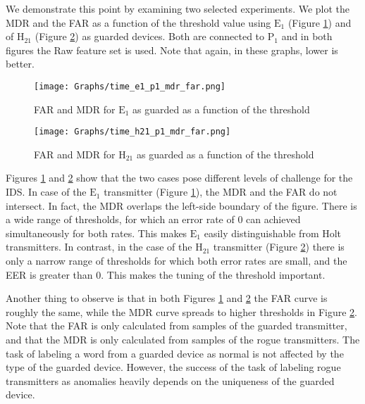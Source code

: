 \documentclass[conference]{IEEEtran}
\begin{document}
  We demonstrate this point by examining two selected experiments. We plot the MDR and the FAR as a function of the threshold value using \(\text{E}_1\) (Figure \ref{fig:detection_easy_example}) and of \(\text{H}_{21}\) (Figure \ref{fig:detection_difficult_example}) as guarded devices. Both are connected to \(\text{P}_1\) and in both figures the Raw feature set is used. Note that again, in these graphs, lower is better.
  
  \begin{figure}[t]
    \centering
    \texttt{[image: Graphs/time\_e1\_p1\_mdr\_far.png]}
    \caption{FAR and MDR for \(\text{E}_1\) as guarded as a function of the threshold}
    \label{fig:detection_easy_example}
  \end{figure}
  
  \begin{figure}[t]
    \centering
    \texttt{[image: Graphs/time\_h21\_p1\_mdr\_far.png]}
    \caption{FAR and MDR for \(\text{H}_{21}\) as guarded as a function of the threshold}
    \label{fig:detection_difficult_example}
  \end{figure}
  
  Figures \ref{fig:detection_easy_example} and \ref{fig:detection_difficult_example} show that the two cases pose different levels of challenge for the IDS.
  In case of the \(\text{E}_1\) transmitter (Figure \ref{fig:detection_easy_example}), the MDR and the FAR do not intersect. In fact, the MDR overlaps the left-side boundary of the figure. There is a wide range of thresholds, for which an error rate of 0 can achieved simultaneously for both rates. This makes \(\text{E}_1\) easily distinguishable from Holt transmitters. In contrast, in the case of the \(\text{H}_{21}\) transmitter (Figure \ref{fig:detection_difficult_example}) there is only a narrow range of thresholds for which both error rates are small, and the EER is greater than 0. This makes the tuning of the threshold important.
  
  Another thing to observe is that in both Figures \ref{fig:detection_easy_example} and \ref{fig:detection_difficult_example} the FAR curve is roughly the same, while the MDR curve spreads to higher thresholds in Figure \ref{fig:detection_difficult_example}. Note that the FAR is only calculated from samples of the guarded transmitter, and that the MDR is only calculated from samples of the rogue transmitters. The task of labeling a word from a guarded device as normal is not affected by the type of the guarded device. However, the success of the task of labeling rogue transmitters as anomalies heavily depends on the uniqueness of the guarded device.
   
\end{document}

